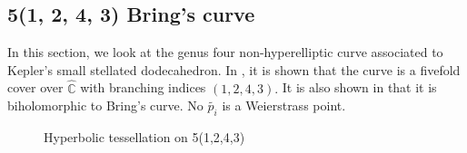 \documentclass[12pt,reqno]{amsart}
\DeclareMathOperator{\Aut}{Aut}
\newcommand{\C}{\mathbb{C}}
\newtheorem{lemma}[theorem]{Lemma}
\theoremstyle{definition}
\theoremstyle{remark}
\newtheorem*{remark}{Remark}
\begin{document}









\subsection*{5(1, 2, 4, 3) Bring's curve}

In this section, we look at the genus four non-hyperelliptic curve associated to Kepler's small stellated dodecahedron. In \cite{matti}, it is shown that the curve is a fivefold cover over $\widehat{\C}$ with branching indices $(1, 2, 4, 3).$ It is also shown in \cite{matti} that it is biholomorphic to Bring's curve. No $\widetilde{p_i}$ is a Weierstrass point.

\begin{figure}[htbp]
    \centering
    \caption{Hyperbolic tessellation on 5(1,2,4,3)}%
    \label{fig:1243}%
\end{figure}
\end{document}
